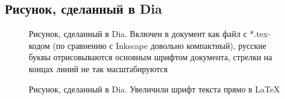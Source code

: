 \subsection{Рисунок, сделанный в Dia}

\begin{figure}[H] \centering

\caption{Рисунок, сделанный в Dia. Включен в документ как файл с *.tex-кодом (по сравнению с Inkscape довольно компактный), русские буквы отрисовываются основным шрифтом документа, стрелки на концах линий не так масштабируются}
\label{ris:image1_dia}
\end{figure}



\begin{figure}[H] \centering {}

\caption{Рисунок, сделанный в Dia. Увеличили шрифт текста прямо в LaTeX}
\label{ris:image1_dia}
\end{figure}








